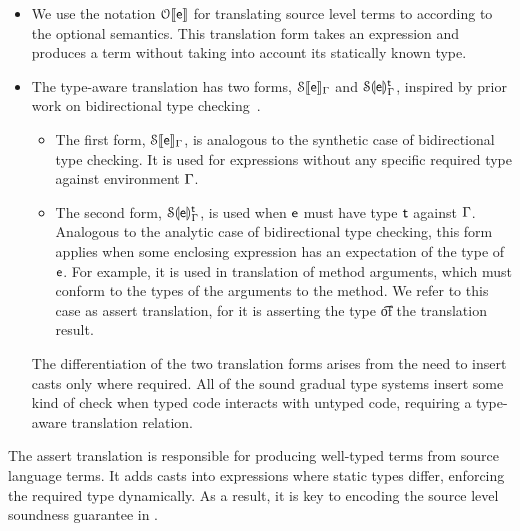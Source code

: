 \documentclass[a4paper,USenglish]{tex/lipics-v2016}
\begin{document}
\begin{itemize}
  \item We use the notation $\TR[\OTS]\e$ for translating source level terms to \kafka
  according to the optional semantics. This translation form takes an expression \e and
  produces a \kafka term without taking into account its statically known type.

  \item The type-aware translation has two forms, $\TRG[\SOMS]\e\Env$ and
  $\TAG[\SOMS]\e\Env\t$, inspired by prior work on bidirectional type
  checking~\cite{pierce:1998:local}. 

  \begin{itemize}
    \item The first form, $\TRG[\SOMS]\e\Env$, is analogous to the synthetic case of bidirectional type checking.
    It is used for expressions \e without any specific required type against environment $\Gamma$.
    \item The second form, $\TAG[\SOMS]\e\Env\t$, is used when $\e$ must have type $\t$ against $\Gamma$.
    Analogous to the analytic case of bidirectional type checking, this form applies when some enclosing
    expression has an expectation of the type of $\e$. For example, it is used in translation of method
    arguments, which must conform to the types of the arguments to the method. We refer to this case
    as assert translation, for it is asserting the type \t of the translation result.
  \end{itemize}

  The differentiation of the two translation forms arises from the need to insert casts
  only where required. All of the sound gradual type systems insert some kind of
  check when typed code interacts with untyped code, requiring a type-aware translation
  relation.
\end{itemize}

The assert translation is responsible for producing well-typed \kafka
terms from source language terms. It adds casts into expressions where static
types differ, enforcing the required type dynamically. As a result, it is key
to encoding the source level soundness guarantee in \kafka.
\end{document}
